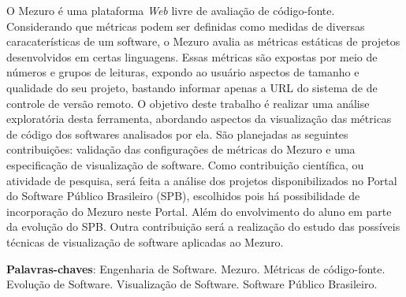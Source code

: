 \begin{resumo}
 O Mezuro é uma plataforma \textit{Web} livre de avaliação de código-fonte.
 Considerando que métricas podem ser definidas como medidas de diversas
 caracaterísticas de um software, o Mezuro avalia as métricas estáticas de
 projetos desenvolvidos em certas linguagens. Essas métricas são expostas por
 meio de números e grupos de leituras, expondo ao usuário aspectos de tamanho e
 qualidade do seu projeto, bastando informar apenas a URL do sistema de
 de controle de versão remoto.
 O objetivo deste trabalho é realizar uma análise exploratória desta ferramenta,
 abordando aspectos da visualização das métricas de código dos softwares
 analisados por ela.
 São planejadas as seguintes contribuições: validação das configurações de
 métricas do Mezuro e uma especificação de visualização de software.
 Como contribuição científica, ou atividade de pesquisa, será feita a análise
 dos projetos disponibilizados no Portal do Software Público Brasileiro (SPB),
 escolhidos pois há possibilidade de incorporação do Mezuro neste Portal. Além
 do envolvimento do aluno em parte da evolução do SPB.
 Outra contribuição será a realização do estudo das possíveis técnicas de
 visualização de software aplicadas ao Mezuro.

 \vspace{\onelineskip}

 \noindent
 \textbf{Palavras-chaves}: Engenharia de Software. Mezuro.
 Métricas de código-fonte. Evolução de Software. Visualização de Software.
 Software Público Brasileiro.
\end{resumo}

